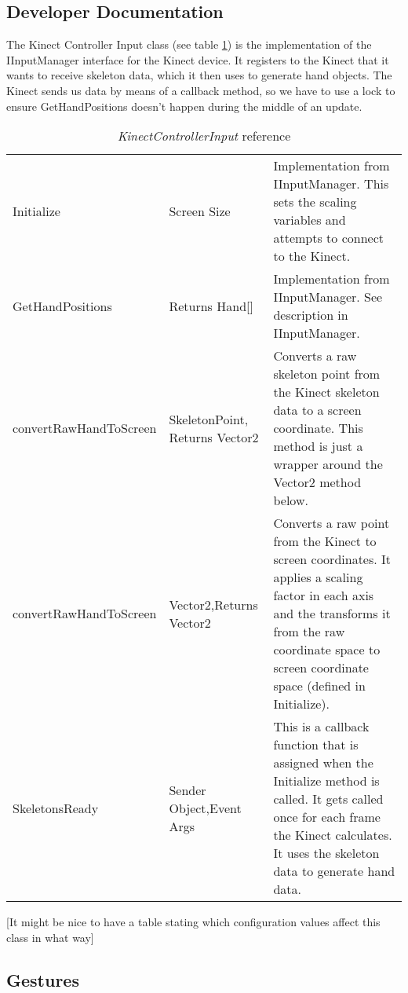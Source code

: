\clearpage{}
\subsection{Developer Documentation}
The Kinect Controller Input class (see table \ref{KinectInputRef}) is the implementation of the IInputManager interface for the Kinect device. It registers to the Kinect that it wants to receive skeleton data, which it then uses to generate hand objects. The Kinect sends us data by means of a callback method, so we have to use a lock to ensure GetHandPositions doesn't happen during the middle of an update.

\begin{table}[h]
\begin{tabular}{|>{\raggedright}p{5cm}|>{\raggedright}p{3.6cm}|>{\raggedright}p{7cm}|}
\hline 
\multicolumn{3}{|c|}{KinectControllerInput}\tabularnewline
\hline 
Initialize & Screen Size & Implementation from IInputManager. This sets the scaling variables
and attempts to connect to the Kinect.\tabularnewline
\hline 
GetHandPositions & Returns Hand{[}{]} & Implementation from IInputManager. See description in IInputManager.\tabularnewline
\hline 
convertRawHandToScreen & SkeletonPoint, Returns Vector2 & Converts a raw skeleton point from the Kinect skeleton data to a screen
coordinate. This method is just a wrapper around the Vector2 method
below.\tabularnewline
\hline 
convertRawHandToScreen & Vector2,\newline Returns Vector2 & Converts a raw point from the Kinect to screen coordinates. It applies
a scaling factor in each axis and the transforms it from the raw coordinate
space to screen coordinate space (defined in Initialize).\tabularnewline
\hline 
SkeletonsReady & Sender Object,\newline Event Args & This is a callback function that is assigned when the Initialize method
is called. It gets called once for each frame the Kinect calculates.
It uses the skeleton data to generate hand data.\tabularnewline
\hline 
\end{tabular}

\caption{\emph{KinectControllerInput} reference}

\label{KinectInputRef}
\end{table}

[It might be nice to have a table stating which configuration values affect this class in what way]

\clearpage{}
\subsection{Gestures}

